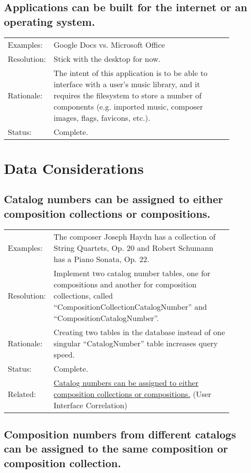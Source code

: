 \documentclass[letterpaper]{report}
\begin{document}
\section{Applications can be built for the internet or an operating system.}
\label{P.3}

\begin{tabular}{ p{0.1\linewidth} p{0.825\linewidth} }
  Examples: & Google Docs vs. Microsoft Office \\ 
  Resolution: & Stick with the desktop for now. \\
  Rationale: & The intent of this application is to be able to interface with a user's music library, and it requires the filesystem to store a number of components (e.g. imported music, composer images, flags, favicons, etc.). \\
  Status: & Complete.
\end{tabular}

\chapter{Data Considerations}

\section{Catalog numbers can be assigned to either composition collections or compositions.}
\label{D.1}

\begin{tabular}{ p{0.1\linewidth} p{0.825\linewidth} }
  Examples: & The composer Joseph Haydn has a collection of String Quartets, Op. 20 and Robert Schumann has a Piano Sonata, Op. 22. \\ 
  Resolution: & Implement two catalog number tables, one for compositions and another for composition collections, called ``CompositionCollectionCatalogNumber'' and ``CompositionCatalogNumber''. \\
  Rationale: & Creating two tables in the database instead of one singular ``CatalogNumber'' table increases query speed. \\
  Status: & Complete. \\
  Related: & \hyperref[UI.1]{Catalog numbers can be assigned to either composition collections or compositions.} (User Interface Correlation)
\end{tabular}

\section{Composition numbers from different catalogs can be assigned to the same composition or composition collection.}
\label{D.2}
\end{document}
